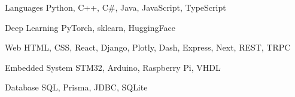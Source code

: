 

\begin{cvskills}

  \cvskill
    {Languages} %
    {Python, C++, C\#, Java, JavaScript, TypeScript} %

  \cvskill
    {Deep Learning} %
    {PyTorch, sklearn, HuggingFace} %

  \cvskill
    {Web} %
    {HTML, CSS, React, Django, Plotly, Dash, Express, Next, REST, TRPC} %

  \cvskill
    {Embedded System} %
    {STM32, Arduino, Raspberry Pi, VHDL} %

  \cvskill
  {Database} %
  {SQL, Prisma, JDBC, SQLite} %

\end{cvskills}
